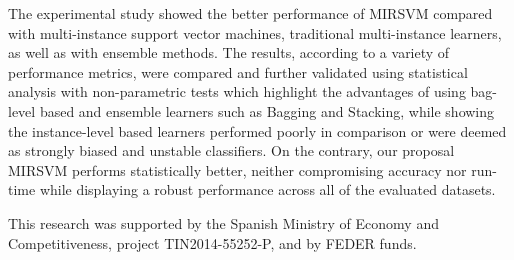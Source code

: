 The experimental study showed the better performance of MIRSVM compared with multi-instance support vector machines, traditional multi-instance learners, as well as with ensemble methods. The results, according to a variety of performance metrics, were compared and further validated using statistical analysis with non-parametric tests which highlight the advantages of using bag-level based and ensemble learners such as Bagging and Stacking, while showing the instance-level based learners performed poorly in comparison or were deemed as strongly biased and unstable classifiers. On the contrary, our proposal MIRSVM performs statistically better, neither compromising accuracy nor run-time while displaying a robust performance across all of the evaluated datasets.

\begin{acknowledgements}
This research was supported by the Spanish Ministry of Economy and Competitiveness, project TIN2014-55252-P, and by FEDER funds.
\end{acknowledgements}


   




